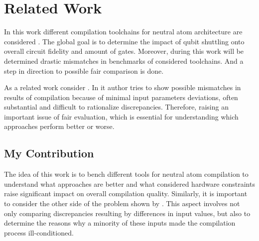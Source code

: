 
\chapter{Related Work}\label{chapter:relatedwork}
In this work different compilation toolchains for neutral atom architecture are considered \parencite{huang2025dasatomdivideandshuttleatomapproach,Tan_2025_Enola, schmid2023hybridcircuitmappingleveraging}.
The global goal is to determine the impact of qubit shuttling onto overall circuit fidelity and amount of gates.
Moreover, during this work will be determined drastic mismatches in benchmarks of considered toolchains. 
And a step in direction to possible fair comparison is done.

As a related work consider \parencite{gao2025optimalcompilationstrategiesqft}.
In it author tries to show possible mismatches in results of compilation because of minimal input parameters deviations, 
often substantial and difficult to rationalize discrepancies. 
Therefore, raising an important issue of fair evaluation, 
which is essential for understanding which approaches perform better or worse.

\section{My Contribution}
The idea of this work is to bench different tools for neutral atom compilation to understand what approaches are better 
and what considered hardware constraints raise significant impact on overall compilation quality.
Similarly, it is important to consider the other side of the problem shown by \parencite{gao2025optimalcompilationstrategiesqft}.
This aspect involves not only comparing discrepancies resulting by differences in input values, 
but also to determine the reasons why a minority of these inputs made the compilation process ill-conditioned.